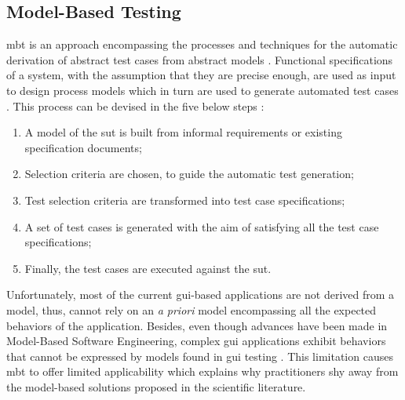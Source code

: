 \subsection{Model-Based Testing}
\label{sec:introduction-model-based-testing}

\gls{mbt} is an approach encompassing the processes and techniques for the automatic derivation of abstract test cases from abstract models \cite{Utting2012}. Functional specifications of a system, with the assumption that they are precise enough, are used as input to design process models which in turn are used to generate automated test cases \cite{Gupta2011}. This process can be devised in the five below steps \cite{Utting2012}:

\begin{enumerate}
    \item A model of the \gls{sut} is built from informal requirements or existing specification documents;
    \item Selection criteria are chosen, to guide the automatic test generation;
    \item Test selection criteria are transformed into test case specifications;
    \item A set of test cases is generated with the aim of satisfying all the test case specifications;
    \item Finally, the test cases are executed against the \gls{sut}.
\end{enumerate}

Unfortunately, most of the current \gls{gui}-based applications are not derived from a model, thus, cannot rely on an \emph{a priori} model encompassing all the expected behaviors of the application. Besides, even though advances have been made in Model-Based Software Engineering, complex \gls{gui} applications exhibit behaviors that cannot be expressed by models found in \gls{gui} testing \cite{Lelli2015}. This limitation causes \gls{mbt} to offer limited applicability which explains why practitioners shy away from the model-based solutions proposed in the scientific literature.

